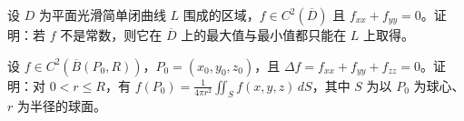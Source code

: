 \newpage
\noindent\begin{minipage}{\textwidth}
设 $D$ 为平面光滑简单闭曲线 $L$ 围成的区域，$f\in C^2(\overline D)$ 且 $f_{xx}+f_{yy}=0$。证明：若 $f$ 不是常数，则它在 $\overline D$ 上的最大值与最小值都只能在 $L$ 上取得。
\end{minipage}\par\vfill
\noindent\begin{minipage}{\textwidth}
设 $f\in C^2(\overline B(P_0,R))$，$P_0=(x_0,y_0,z_0)$，且 $\Delta f=f_{xx}+f_{yy}+f_{zz}=0$。证明：对 $0<r\le R$，有 $\displaystyle f(P_0)=\frac1{4\pi r^2}\iint_Sf(x,y,z)\,dS$，其中 $S$ 为以 $P_0$ 为球心、$r$ 为半径的球面。
\end{minipage}\par\vfill
